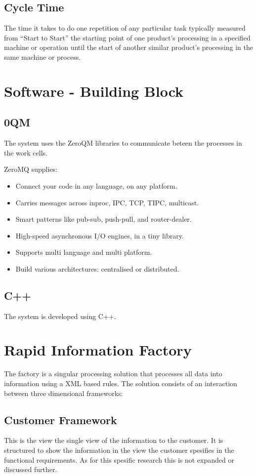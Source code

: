 \documentclass{sigplanconf}
\begin{document}
\subsection{Cycle Time}
The time it takes to do one repetition of any particular task typically measured from “Start to Start” the starting point of one product’s processing in a specified machine or operation until the start of another similar product’s processing in the same machine or process. 

\section{Software - Building Block}

\subsection{0QM}
The system uses the ZeroQM \cite{hintjens2011omq} libraries to communicate beteen the processes in the work cells.

ZeroMQ supplies:
\begin{itemize}
  \item Connect your code in any language, on any platform.
  \item Carries messages across inproc, IPC, TCP, TIPC, multicast.
  \item Smart patterns like pub-sub, push-pull, and router-dealer.
  \item High-speed asynchronous I/O engines, in a tiny library.
  \item Supports multi language and multi platform.
  \item Build various architectures: centralised or distributed.
\end{itemize}

\subsection{C++}

The system is developed using C++.

\section{Rapid Information Factory}
The factory is a singular processing solution that processes all data into information using a XML based rules. The solution consists of an interaction between three dimensional frameworks:
\subsection{Customer Framework}
This is the view the single view of the information to the customer. It is structured to show the information in the view the customer spesifies in the functional requirements. As for this spesific research this is not expanded or discussed further.
\end{document}

